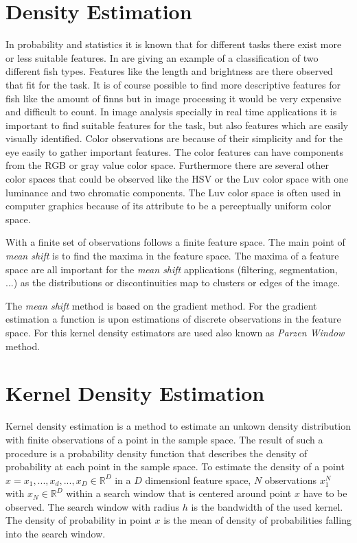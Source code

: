 \section{Density Estimation} %
\label{sec:density_estimation}
In probability and statistics it is known that for different tasks there exist 
more or less suitable features. In 
\citep{citeulike:167581} \citeauthor{citeulike:167581}  are giving an example of 
a classification of two different fish types. Features like the length and 
brightness are there observed that fit for the task. It is of course possible 
to find more descriptive features for fish like the amount of finns but in 
image processing it would be very expensive and difficult to count. In image
analysis specially in real time applications it is important to find suitable
features for the task, but also features which are easily visually identified. 
Color observations are because of their simplicity and for the eye easily to 
gather important features. The color features can have components from the 
\gls{RGB} or gray value color space. Furthermore there are several other color
spaces that could be observed like the \gls{HSV} or the \gls{Luv} color space
with one luminance and two chromatic components. The \gls{Luv} color space is
often used in computer graphics because of its attribute to be a perceptually
uniform color space.

With a finite set of observations follows a finite feature space. The main point
of \emph{mean shift} is to find the maxima in the feature space. The maxima of a
feature space are all important for the \emph{mean shift} applications
(filtering, segmentation, ...) as the distributions or discontinuities map to
clusters or edges of the image.

The \emph{mean shift} method is based on the gradient method. For the gradient
estimation a function is upon estimations of discrete observations in the
feature space. For this kernel density estimators are used also known as 
\emph{Parzen Window} method.


\section{Kernel Density Estimation} %
\label{sec:kernel_density_estimation}
Kernel density estimation is a method to estimate an unkown density
distribution with finite observations of a point in the sample space. 
The result of such a procedure is a probability density function that describes 
the density of probability at each point in the sample space. To estimate the 
density of a point $x = { x_1, ... , x_d, ... , x_D} \in \mathbb{R}^D$ in a 
$D$ dimensionl feature space, $N$ observations $x_1^N$ with
 $x_N \in \mathbb{R}^D$ within a search window that is centered around point $x$
have to be observed. The search window with radius $h$ is the bandwidth of the
used kernel. The density of probability in point $x$ is the mean of density of
{\color{iRed}probabilities falling into the search window.}


